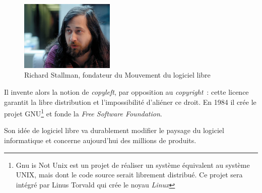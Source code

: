 \documentclass[a4paper,11pt]{book}
\begin{document}
\begin{figure}[h]
    \centering
    \includegraphics[width=0.4\textwidth]{media/portraits/440px-Richard_Matthew_Stallman.jpeg}
    \caption{Richard Stallman, fondateur du Mouvement du logiciel libre}
    \label{stallman}
\end{figure}

Il invente alors la notion de \textit{copyleft}, par opposition au \textit{copyright}~: cette licence garantit la libre distribution et l'impossibilité d'aliéner ce droit. En 1984 il crée le projet GNU\footnote{Gnu is Not Unix est un projet de réaliser un système équivalent au système UNIX, mais dont le code source serait librement distribué. Ce projet sera intégré par Linus Torvald qui crée le noyau \textit{Linux}} et fonde la \textit{Free Software Foundation}.

Son idée de logiciel libre va durablement modifier le paysage du logiciel informatique et concerne aujourd'hui des millions de produits.
\end{document}
